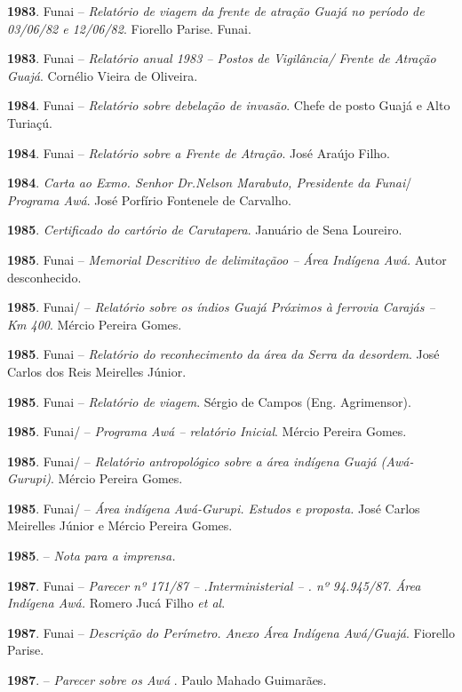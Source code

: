 \begin{Parskip}
\textbf{1983}. Funai -- \emph{Relatório de viagem da frente de atração
Guajá no período de 03/06/82 e 12/06/82}. Fiorello Parise. Funai.

\textbf{1983}. Funai -- \emph{Relatório anual 1983 -- Postos de
Vigilância/ Frente de Atração Guajá}. Cornélio Vieira de Oliveira.

\textbf{1984}. Funai -- \emph{Relatório sobre debelação de invasão}.
Chefe de posto Guajá e Alto Turiaçú.

\textbf{1984}. Funai -- \emph{Relatório sobre a Frente de Atração}. José
Araújo Filho.

\textbf{1984}. \emph{Carta ao Exmo. Senhor Dr.Nelson Marabuto,
Presidente da Funai}/ \emph{Programa Awá}. José Porfírio Fontenele de
Carvalho.

\textbf{1985}. \emph{Certificado do cartório de Carutapera}. Januário de
Sena Loureiro.

\textbf{1985}. Funai -- \emph{Memorial Descritivo de delimitaçãoo --
Área Indígena Awá.} Autor desconhecido.

\textbf{1985}. Funai/ -- \emph{Relatório sobre os índios Guajá
Próximos à ferrovia Carajás -- Km 400}. Mércio Pereira Gomes.

\textbf{1985}. Funai -- \emph{Relatório do reconhecimento da área da
Serra da desordem}. José Carlos dos Reis Meirelles Júnior.

\textbf{1985}. Funai -- \emph{Relatório de viagem}. Sérgio de Campos
(Eng. Agrimensor).

\textbf{1985}. Funai/ -- \emph{Programa Awá -- relatório Inicial}.
Mércio Pereira Gomes.

\textbf{1985}. Funai/ -- \emph{Relatório antropológico sobre a área
indígena Guajá (Awá-Gurupi)}. Mércio Pereira Gomes.

\textbf{1985}. Funai/  -- \emph{Área indígena Awá-Gurupi. Estudos e
proposta.} José Carlos Meirelles Júnior e Mércio Pereira Gomes.

\textbf{1985}.  -- \emph{Nota para a imprensa.}

\textbf{1987}. Funai -- \emph{Parecer nº 171/87 -- .Interministerial
-- . nº 94.945/87. Área Indígena Awá.} Romero Jucá Filho \emph{et
al}.

\textbf{1987}. Funai -- \emph{Descrição do Perímetro. Anexo Área Indígena
Awá/Guajá}. Fiorello Parise.

\textbf{1987}.  -- \emph{Parecer sobre os Awá} . Paulo Mahado
Guimarães.


\end{Parskip}
